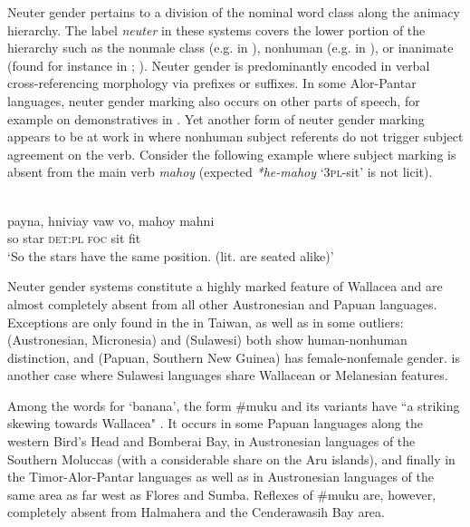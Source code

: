 Neuter gender pertains to a division of the nominal word class along the animacy hierarchy. The label \textit{neuter} in these systems covers the lower portion of the hierarchy such as the nonmale class (e.g. in ), nonhuman (e.g. in ), or inanimate (found for instance in ; \citealt[128]{schapper2015wallacea}). Neuter gender is predominantly encoded in verbal cross-referencing morphology via prefixes or suffixes. In some Alor-Pantar languages, neuter gender marking also occurs on other parts of speech, for example on demonstratives in . Yet another form of neuter gender marking appears to be at work in  where nonhuman subject referents do not trigger subject agreement on the verb. Consider the following example where subject marking is absent from the main verb \textit{mahoy} (expected \textit{*he-mahoy} `\textsc{3pl}-sit' is not licit).

\ea 
\\
\gll payna, hniviay vaw vo, mahoy mahni \\
so star \textsc{det}:\textsc{pl} \textsc{foc} sit fit \\
\glft `So the stars have the same position.
(lit. are seated alike)'\\ 
\z
\xe

Neuter gender systems constitute a highly marked feature of Wallacea and are almost completely absent from all other Austronesian and Papuan languages. Exceptions are only found in the  in Taiwan, as well as in some outliers:  (Austronesian, Micronesia) and  (Sulawesi) both show human-nonhuman distinction, and  (Papuan, Southern New Guinea) has female-nonfemale gender.  is another case where Sulawesi languages share Wallacean or Melanesian features.

Among the words for `banana', the form \#muku and its variants have ``a striking skewing towards Wallacea" \citep[132]{schapper2015wallacea}. It occurs in some Papuan languages along the western Bird's Head and Bomberai Bay, in Austronesian languages of the Southern Moluccas (with a considerable share on the Aru islands), and finally in the Timor-Alor-Pantar languages as well as in Austronesian languages of the same area as far west as Flores and Sumba. Reflexes of \#muku are, however, completely absent from Halmahera and the Cenderawasih Bay area.

